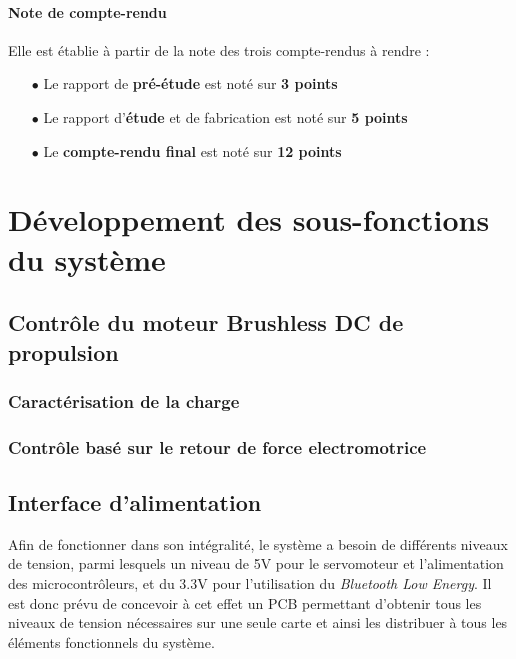 \documentclass[a4paper,12pt]{report}
\begin{document}
			\vspace{-1.5em}
			
			\paragraph{Note de compte-rendu}
			
			Elle est établie à partir de la note des trois compte-rendus à rendre :
			
			\begin{itemize}
				\item[$\bullet$] Le rapport de \textbf{pré-étude} est noté sur \textbf{3 points}
				\item[$\bullet$] Le rapport d'\textbf{étude} et de fabrication est noté sur \textbf{5 points}
				\item[$\bullet$] Le \textbf{compte-rendu final} est noté sur \textbf{12 points}
			\end{itemize}
	
	\section{Développement des sous-fonctions du système}
	
		
		\subsection{Contrôle du moteur Brushless DC de propulsion}
		
			\subsubsection{Caractérisation de la charge}
			
			\subsubsection{Contrôle basé sur le retour de force electromotrice}
	
		\subsection{Interface d'alimentation}
		
		Afin de fonctionner dans son intégralité, le système a besoin de différents niveaux de tension, parmi lesquels un niveau de 5V pour le servomoteur et l'alimentation des microcontrôleurs, et du 3.3V pour l'utilisation du \textit{Bluetooth Low Energy}. Il est donc prévu de concevoir à cet effet un PCB permettant d'obtenir tous les niveaux de tension nécessaires sur une seule carte et ainsi les distribuer à tous les éléments fonctionnels du système.
		
\end{document}
